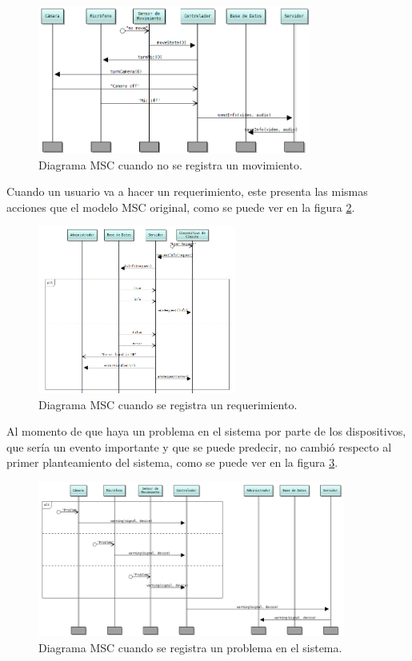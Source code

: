 \begin{figure}[h]
    \centering
    \includegraphics[width=0.8\textwidth]{images/NoMove_MSCx.png}
    \caption{Diagrama MSC cuando no se registra un movimiento.}
    \label{NoMoveMSCx}
\end{figure}

Cuando un usuario va a hacer un requerimiento, este presenta las mismas acciones que el modelo MSC original, como se puede ver en la figura \ref{RequestMSCx}.

\begin{figure}[h]
    \centering
    \includegraphics[width=0.58\textwidth]{images/UserRequest_MSCx.png}
    \caption{Diagrama MSC cuando se registra un requerimiento.}
    \label{RequestMSCx}
\end{figure}

\pagebreak

Al momento de que haya un problema en el sistema por parte de los dispositivos, que sería un evento importante y que se puede predecir, no cambió respecto al primer planteamiento del sistema, como se puede ver en la figura \ref{ProblemMSCx}.

\begin{figure}[h]
    \centering
    \includegraphics[width=0.9\textwidth]{images/Problem_MSCx.png}
    \caption{Diagrama MSC cuando se registra un problema en el sistema.}
    \label{ProblemMSCx}
\end{figure}

